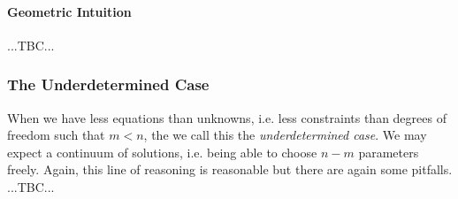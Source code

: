 




\paragraph{Geometric Intuition} ...TBC...

\subsubsection{The Underdetermined Case}
When we have less equations than unknowns, i.e. less constraints than degrees of freedom such that $m < n$, the we call this the \emph{underdetermined case}. We may expect a continuum of solutions, i.e. being able to choose $n-m$ parameters freely. Again, this line of reasoning is reasonable but there are again some pitfalls. ...TBC...

